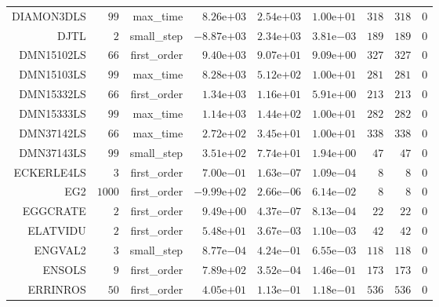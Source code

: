 \begin{longtable}{rrrrrrrrr}
DIAMON3DLS & \(    99\) & max\_time & \( 8.26\)e\(+03\) & \( 2.54\)e\(+03\) & \( 1.00\)e\(+01\) & \(   318\) & \(   318\) & \(     0\) \\
DJTL & \(     2\) & small\_step & \(-8.87\)e\(+03\) & \( 2.34\)e\(+03\) & \( 3.81\)e\(-03\) & \(   189\) & \(   189\) & \(     0\) \\
DMN15102LS & \(    66\) & first\_order & \( 9.40\)e\(+03\) & \( 9.07\)e\(+01\) & \( 9.09\)e\(+00\) & \(   327\) & \(   327\) & \(     0\) \\
DMN15103LS & \(    99\) & max\_time & \( 8.28\)e\(+03\) & \( 5.12\)e\(+02\) & \( 1.00\)e\(+01\) & \(   281\) & \(   281\) & \(     0\) \\
DMN15332LS & \(    66\) & first\_order & \( 1.34\)e\(+03\) & \( 1.16\)e\(+01\) & \( 5.91\)e\(+00\) & \(   213\) & \(   213\) & \(     0\) \\
DMN15333LS & \(    99\) & max\_time & \( 1.14\)e\(+03\) & \( 1.44\)e\(+02\) & \( 1.00\)e\(+01\) & \(   282\) & \(   282\) & \(     0\) \\
DMN37142LS & \(    66\) & max\_time & \( 2.72\)e\(+02\) & \( 3.45\)e\(+01\) & \( 1.00\)e\(+01\) & \(   338\) & \(   338\) & \(     0\) \\
DMN37143LS & \(    99\) & small\_step & \( 3.51\)e\(+02\) & \( 7.74\)e\(+01\) & \( 1.94\)e\(+00\) & \(    47\) & \(    47\) & \(     0\) \\
ECKERLE4LS & \(     3\) & first\_order & \( 7.00\)e\(-01\) & \( 1.63\)e\(-07\) & \( 1.09\)e\(-04\) & \(     8\) & \(     8\) & \(     0\) \\
EG2 & \(  1000\) & first\_order & \(-9.99\)e\(+02\) & \( 2.66\)e\(-06\) & \( 6.14\)e\(-02\) & \(     8\) & \(     8\) & \(     0\) \\
EGGCRATE & \(     2\) & first\_order & \( 9.49\)e\(+00\) & \( 4.37\)e\(-07\) & \( 8.13\)e\(-04\) & \(    22\) & \(    22\) & \(     0\) \\
ELATVIDU & \(     2\) & first\_order & \( 5.48\)e\(+01\) & \( 3.67\)e\(-03\) & \( 1.10\)e\(-03\) & \(    42\) & \(    42\) & \(     0\) \\
ENGVAL2 & \(     3\) & small\_step & \( 8.77\)e\(-04\) & \( 4.24\)e\(-01\) & \( 6.55\)e\(-03\) & \(   118\) & \(   118\) & \(     0\) \\
ENSOLS & \(     9\) & first\_order & \( 7.89\)e\(+02\) & \( 3.52\)e\(-04\) & \( 1.46\)e\(-01\) & \(   173\) & \(   173\) & \(     0\) \\
ERRINROS & \(    50\) & first\_order & \( 4.05\)e\(+01\) & \( 1.13\)e\(-01\) & \( 1.18\)e\(-01\) & \(   536\) & \(   536\) & \(     0\) \\

\end{longtable}
